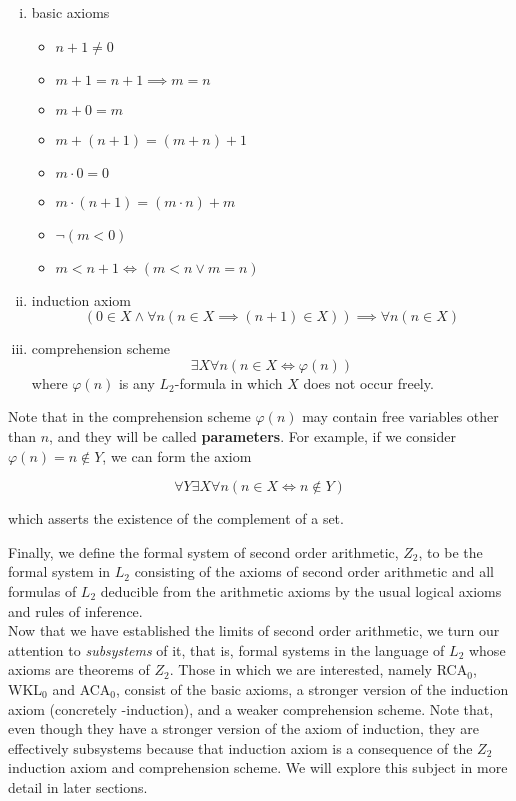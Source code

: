 \documentclass[../main.tex]{memoir}
\begin{document}
\begin{enumerate}[(i)]
\item basic axioms
  \begin{itemize}
  \item $n + 1 \neq 0$
  \item $m + 1 = n + 1 \implies m = n$
  \item $m + 0 = m$
  \item $m + (n + 1) = (m + n) + 1$
  \item $m \cdot 0 = 0$
  \item $m \cdot (n + 1) = (m \cdot n) + m$
  \item $\neg(m < 0)$
  \item $m < n + 1 \iff (m < n \lor m = n)$
  \end{itemize}
\item induction axiom
  $$(0 \in X \land \forall n (n \in X \implies (n + 1) \in X)) \implies \forall n (n \in X)$$
\item comprehension scheme
  $$\exists X \forall n (n \in X \iff \varphi(n))$$
  where $\varphi(n)$ is any $L_2$-formula in which $X$ does not occur freely.
\end{enumerate}

Note that in the comprehension scheme $\varphi(n)$ may contain free variables other than $n$, and they will be called \textbf{parameters}. For example, if we consider $\varphi(n) = n \not\in Y$, we can form the axiom

$$ \forall Y \exists X \forall n (n \in X \iff n \not\in Y) $$

which asserts the existence of the complement of a set.

Finally, we define the formal system of second order arithmetic, $Z_2$, to be the formal system in $L_2$ consisting of the axioms of second order arithmetic and all formulas of $L_2$ deducible from the arithmetic axioms by the usual logical axioms and rules of inference. \\

Now that we have established the limits of second order arithmetic, we turn our attention to \textit{subsystems} of it, that is, formal systems in the language of $L_2$ whose axioms are theorems of $Z_2$. Those in which we are interested, namely RCA$_0$, WKL$_0$ and ACA$_0$, consist of the basic axioms, a stronger version of the induction axiom (concretely \re-induction), and a weaker comprehension scheme. Note that, even though they have a stronger version of the axiom of induction, they are effectively subsystems because that induction axiom is a consequence of the $Z_2$ induction axiom and comprehension scheme. We will explore this subject in more detail in later sections.
\end{document}
